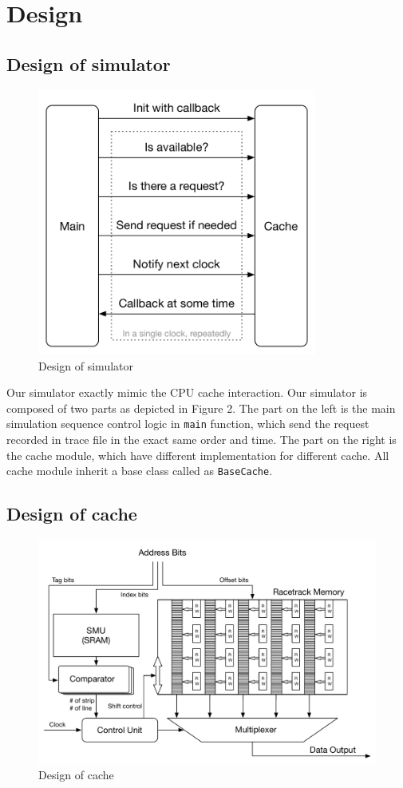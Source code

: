 \documentclass[11pt]{article}
\begin{document}
\section{Design}

\subsection{Design of simulator}

\begin{figure}
\centering
\includegraphics[width=260pt]{fig2.pdf}
\caption{Design of simulator}
\label{fig:design1}
\end{figure}

Our simulator exactly mimic the CPU cache interaction. Our simulator is composed of two parts as depicted in Figure 2. The part on the left is the main simulation sequence control logic in \texttt{main} function, which send the request recorded in trace file in the exact same order and time. The part on the right is the cache module, which have different implementation for different cache. All cache module inherit a base class called as \texttt{BaseCache}.

\subsection{Design of cache}

\begin{figure}
\centering
\includegraphics[width=400pt]{fig4.pdf}
\caption{Design of cache}
\label{fig:design2}
\end{figure}
\end{document}
